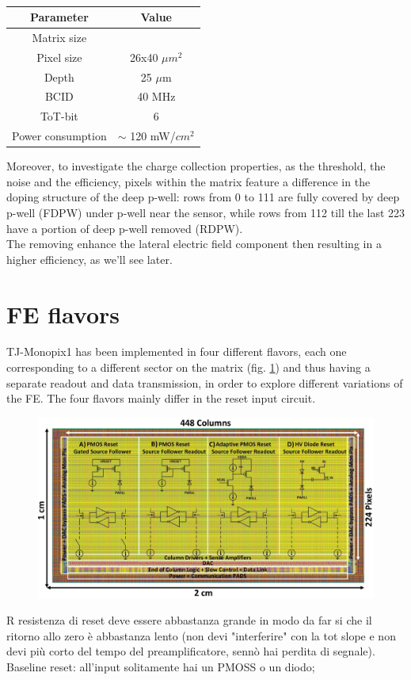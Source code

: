     \begin{table}
        \begin{center}
        \begin{tabular}{| c |c |}
        \hline
        Parameter & Value\\
        \hline
        \hline
        Matrix size & \\
        Pixel size & 26x40 $\mu m^2$\\
        Depth & 25 $\mu$m \\
        BCID & 40 MHz \\
        ToT-bit & 6 \\
        Power consumption & $\sim$ 120 mW/$cm^2$\\
        \hline
        \end{tabular}
        \caption{}
        \label{tab:LF-TJ-Monopix}
        \end{center}
    \end{table}
    Moreover, to investigate the charge collection properties, as the threshold, the noise and the efficiency, pixels within the matrix feature a difference in the doping structure of the deep p-well: rows from 0 to 111 are fully covered by deep p-well (FDPW) under p-well near the sensor, while rows from 112 till the last 223 have a portion of deep p-well removed (RDPW). \\
    The removing enhance the lateral electric field component then resulting in a higher efficiency, as we'll see later.\\

\section{FE flavors}
    TJ-Monopix1 has been implemented in four different flavors, each one corresponding to a different sector on the matrix (fig. \ref{fig:Monopix1_flavors}) and thus having a separate readout and data transmission, in order to explore different variations of the FE. The four flavors mainly differ in the reset input circuit.
    \begin{figure}[h!]
        \centering
        \includegraphics[width=.5\linewidth]{figures/Monopix1/Monopix1_flavors.png}
        \caption{}
        \label{fig:Monopix1_flavors}
    \end{figure}
    R resistenza di reset deve essere abbastanza grande in modo da far si che il ritorno allo zero è abbastanza lento (non devi "interferire" con la tot slope e non devi più corto del tempo del preamplificatore, sennò hai perdita di segnale).\\
    Baseline reset: all'input solitamente hai un PMOSS o un diodo;  

